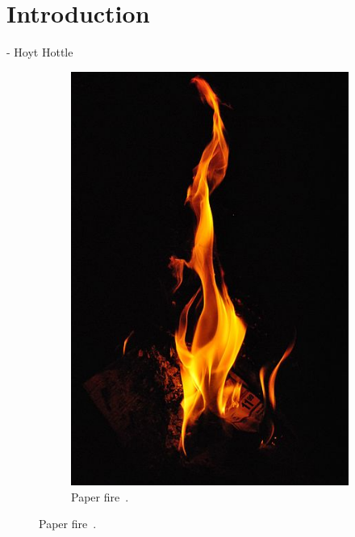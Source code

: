 \chapter{Introduction}
\label{ch:introduction}
 - Hoyt Hottle

\begin{figure}[htpb!]
        \centering
        \begin{subfigure}[t]{0.245\textwidth}
                \includegraphics[width=\textwidth]{img/real_fire1}
                \caption{Paper fire~\cite{real_fire1}.}
                \label{fig:real_fire1}
        \end{subfigure}%

\end{figure}
